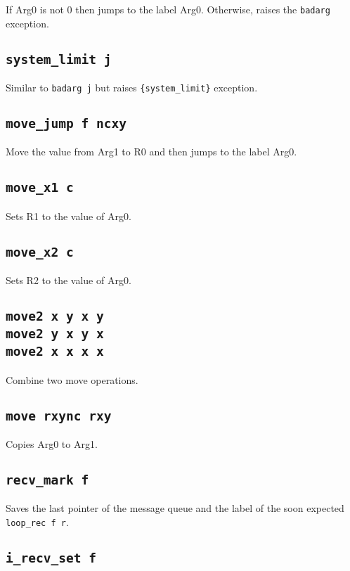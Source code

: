\documentclass{article}
\newcommand{\iop}[1]{\texttt{#1}}
\begin{document}
If Arg0 is not 0 then jumps to the label Arg0. Otherwise, raises the
\verb$badarg$ exception.

\subsection*{\iop{system\_limit j}}

Similar to \iop{badarg j} but raises \verb${system_limit}$ exception.

\subsection*{\iop{move\_jump f ncxy}}

Move the value from Arg1 to R0 and then jumps to the label Arg0.

\subsection*{\iop{move\_x1 c}}

Sets R1 to the value of Arg0.

\subsection*{\iop{move\_x2 c}}

Sets R2 to the value of Arg0.

\subsection*{\iop{move2 x y x y}\\
\iop{move2 y x y x}\\
\iop{move2 x x x x}}

Combine two move operations.

\subsection*{\iop{move rxync rxy}}

Copies Arg0 to Arg1.

\subsection*{\iop{recv\_mark f}}

Saves the last pointer of the message queue and the label of the soon expected
\iop{loop\_rec f r}.

\subsection*{\iop{i\_recv\_set f}}
\end{document}
